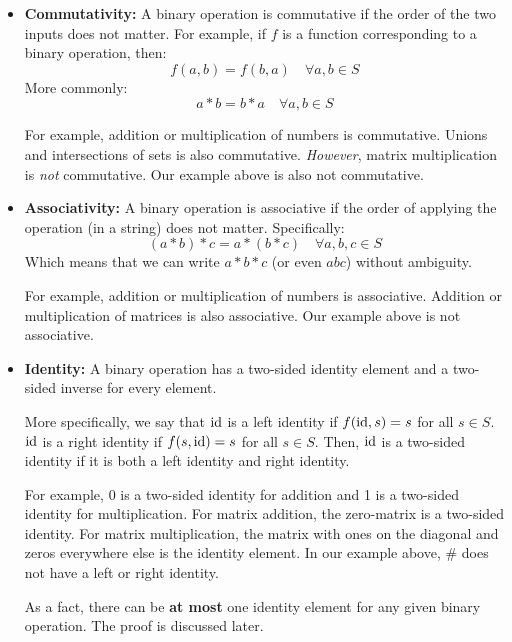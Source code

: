 \documentclass[letterpaper]{article}
\begin{document}
\begin{itemize}
    \item \textbf{Commutativity:} A binary operation is commutative if the order of the two inputs does not matter. For example, if $f$ is a function corresponding to a binary operation, then:
    \[f(a, b) = f(b, a) \quad \forall a, b \in S\] 
    More commonly:
    \[a * b = b * a \quad \forall a, b \in S\]

    For example, addition or multiplication of numbers is commutative. Unions and intersections of sets is also commutative. \emph{However}, matrix multiplication is \emph{not} commutative. Our example above is also not commutative. 

    \item \textbf{Associativity:} A binary operation is associative if the order of applying the operation (in a string) does not matter. Specifically:
    \[(a * b) * c = a * (b * c) \quad \forall a, b, c \in S\]
    Which means that we can write $a * b * c$ (or even $abc$) without ambiguity.
    
    \bigskip 

    For example, addition or multiplication of numbers is associative. Addition or multiplication of matrices is also associative. Our example above is not associative. 

    \item \textbf{Identity:} A binary operation has a two-sided identity element and a two-sided inverse for every element. 
    
    \bigskip 
    
    More specifically, we say that $\operatorname{id}$ is a left identity if $f(\operatorname{id}, s) = s$ for all $s \in S$. $\operatorname{id}$ is a right identity if $f(s, \operatorname{id}) = s$ for all $s \in S$. Then, $\operatorname{id}$ is a two-sided identity if it is both a left identity and right identity.  
    
    \bigskip 

    For example, 0 is a two-sided identity for addition and 1 is a two-sided identity for multiplication. For matrix addition, the zero-matrix is a two-sided identity. For matrix multiplication, the matrix with ones on the diagonal and zeros everywhere else is the identity element. In our example above, $\#$ does not have a left or right identity. 

    \bigskip 

    As a fact, there can be \textbf{at most} one identity element for any given binary operation. The proof is discussed later. 


\end{itemize}
\end{document}
